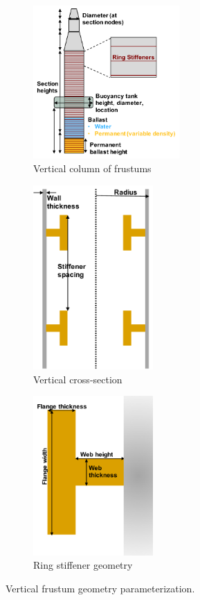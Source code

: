 \begin{figure}
  \begin{subfigure}[b]{0.38\linewidth}
    \centering \includegraphics[width=2.2in]{figs/colGeom}
    \caption{Vertical column of frustums}
  \end{subfigure}
  \begin{subfigure}[b]{0.29\linewidth}
    \centering \includegraphics[width=1.8in]{figs/stiffenerCut}
    \caption{Vertical cross-section}
  \end{subfigure}
  \begin{subfigure}[b]{0.29\linewidth}
    \centering \includegraphics[width=1.8in]{figs/stiffenerZoom}
    \caption{Ring stiffener geometry}
  \end{subfigure}
  \caption{Vertical frustum geometry parameterization.}
  \label{fig:column}
\end{figure}

